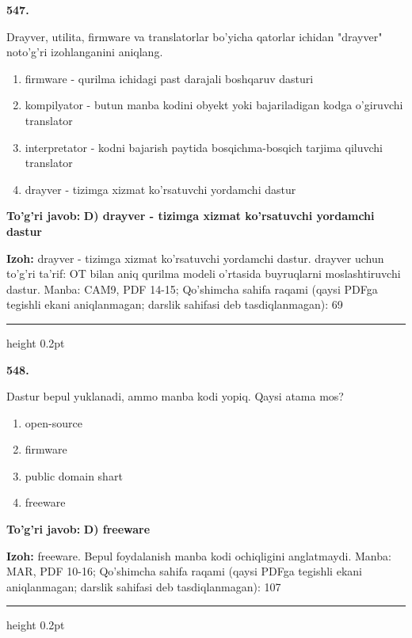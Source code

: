 \documentclass[10pt,a4paper]{article}
\begin{document}
{\bfseries\sffamily\color{ink} 547.}
\par
Drayver, utilita, firmware va translatorlar bo'yicha qatorlar ichidan "drayver" noto'g'ri izohlanganini aniqlang.
\begin{enumerate}[label=\Alph*),leftmargin=9mm]
\item firmware - qurilma ichidagi past darajali boshqaruv dasturi
\item kompilyator - butun manba kodini obyekt yoki bajariladigan kodga o'giruvchi translator
\item interpretator - kodni bajarish paytida bosqichma-bosqich tarjima qiluvchi translator
\item drayver - tizimga xizmat ko'rsatuvchi yordamchi dastur
\end{enumerate}
\begin{tcolorbox}[enhanced,breakable,colback=teal!4,colframe=teal!60!black,boxrule=0.45pt,arc=1.2mm,left=2.7mm,right=2.7mm,top=1.8mm,bottom=1.8mm,before skip=2mm,after skip=2mm]
{\bfseries\sffamily\color{teal}To'g'ri javob:} \textbf{D) drayver - tizimga xizmat ko'rsatuvchi yordamchi dastur}
\par\smallskip
{\bfseries Izoh:} drayver - tizimga xizmat ko'rsatuvchi yordamchi dastur. drayver uchun to'g'ri ta'rif: OT bilan aniq qurilma modeli o'rtasida buyruqlarni moslashtiruvchi dastur. Manba: CAM9, PDF 14-15; Qo'shimcha sahifa raqami (qaysi PDFga tegishli ekani aniqlanmagan; darslik sahifasi deb tasdiqlanmagan): 69
\end{tcolorbox}
\vspace{2mm}\hrule height 0.2pt\vspace{3mm}

{\bfseries\sffamily\color{ink} 548.}
\par
Dastur bepul yuklanadi, ammo manba kodi yopiq. Qaysi atama mos?
\begin{enumerate}[label=\Alph*),leftmargin=9mm]
\item open-source
\item firmware
\item public domain shart
\item freeware
\end{enumerate}
\begin{tcolorbox}[enhanced,breakable,colback=teal!4,colframe=teal!60!black,boxrule=0.45pt,arc=1.2mm,left=2.7mm,right=2.7mm,top=1.8mm,bottom=1.8mm,before skip=2mm,after skip=2mm]
{\bfseries\sffamily\color{teal}To'g'ri javob:} \textbf{D) freeware}
\par\smallskip
{\bfseries Izoh:} freeware. Bepul foydalanish manba kodi ochiqligini anglatmaydi. Manba: MAR, PDF 10-16; Qo'shimcha sahifa raqami (qaysi PDFga tegishli ekani aniqlanmagan; darslik sahifasi deb tasdiqlanmagan): 107
\end{tcolorbox}
\vspace{2mm}\hrule height 0.2pt\vspace{3mm}
\end{document}
